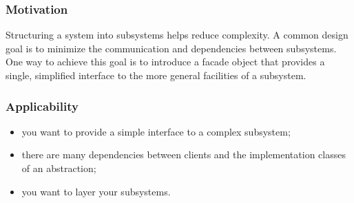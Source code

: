 \documentclass[10pt,xcolor={usenames,dvipsnames}]{beamer}
\begin{document}
\begin{frame}[fragile]
	\frametitle{Motivation}
	\begin{exampleblock}{}
Structuring a system into subsystems helps reduce complexity. A common design goal is to minimize the communication and dependencies between subsystems. One way to achieve this goal is to introduce a facade object that provides a single, simplified interface to the more general facilities of a subsystem.
	\end{exampleblock}
\end{frame}

\begin{frame}[fragile]
	\frametitle{Applicability}
	\begin{exampleblock}{}
		\begin{itemize}
			\item you want to provide a simple interface to a complex subsystem;
			\item there are many dependencies between clients and the implementation classes
of an abstraction;
			\item you want to layer your subsystems.
		\end{itemize}
	\end{exampleblock}
\end{frame}
\end{document}

